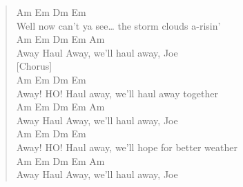 \documentclass[11pt]{article}
\begin{document}
\begin{verse}
\hspace*{3em}Am             Em          Dm           Em\\
Well now can't ya see\ldots{} the storm clouds a-risin'\\
Am         Em         Dm   Em    Am\\
Away Haul Away, we'll haul away, Joe\\
\vspace*{1em}
\vspace*{1em}
[Chorus]\\
Am        Em              Dm          Em\\
Away! HO! Haul away, we'll haul away together\\
Am         Em         Dm   Em    Am\\
Away Haul Away, we'll haul away, Joe\\
Am        Em               Dm              Em\\
Away! HO! Haul away, we'll hope for better weather\\
Am         Em         Dm   Em    Am\\
Away Haul Away, we'll haul away, Joe\\
\end{verse}
\clearpage
\end{document}
